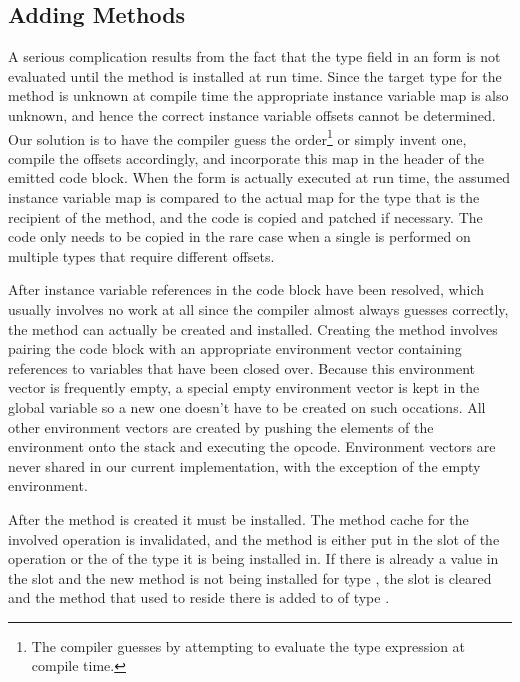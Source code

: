 \subsection{Adding Methods}

A serious complication results from the fact that the type field in an
 form is not evaluated until the method is installed at
run time.  Since the target type for the method is unknown at compile
time the appropriate instance variable map is also unknown, and hence
the correct instance variable offsets cannot be determined.  Our
solution is to have the compiler guess the order\footnote{The compiler
guesses by attempting to evaluate the type expression at compile
time.} or simply invent one, compile the offsets accordingly, and
incorporate this map in the header of the emitted code block.  When
the  form is actually executed at run time, the assumed
instance variable map is compared to the actual map for the type that
is the recipient of the method, and the code is copied and patched if
necessary.  The code only needs to be copied in the rare case when a
single  is performed on multiple types that require
different offsets.

After instance variable references in the code block have been
resolved, which usually involves no work at all since the compiler
almost always guesses correctly, the method can actually be created
and installed.  Creating the method involves pairing the code block
with an appropriate environment vector containing references to
variables that have been closed over.  Because this environment vector
is frequently empty, a special empty environment vector is kept in the
global variable  so a new one doesn't have to
be created on such occations.  All other environment vectors are
created by pushing the elements of the environment onto the stack and
executing the  opcode.  Environment
vectors are never shared in our current implementation, with the
exception of the empty environment.

After the method is created it must be installed.  The method cache
for the involved operation is invalidated, and the method is either
put in the  slot of the operation or the
 of the type it is being installed in.  If
there is already a value in the  slot and the new method
is not being installed for type , the  slot is
cleared and the method that used to reside there is added to
 of type .

